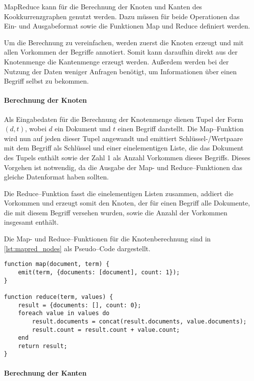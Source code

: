 MapReduce kann für die Berechnung der Knoten und Kanten des Kookkurrenzgraphen genutzt werden. Dazu müssen für beide Operationen das Ein- und Ausgabeformat sowie die Funktionen Map und Reduce definiert werden.

Um die Berechnung zu vereinfachen, werden zuerst die Knoten erzeugt und mit allen Vorkommen der Begriffe annotiert. Somit kann daraufhin direkt aus der Knotenmenge die Kantenmenge erzeugt werden. Außerdem werden bei der Nutzung der Daten weniger Anfragen benötigt, um Informationen über einen Begriff selbst zu bekommen.

\paragraph{Berechnung der Knoten}

Als Eingabedaten für die Berechnung der Knotenmenge dienen Tupel der Form \((d, t)\), wobei \(d\) ein Dokument und \(t\) einen Begriff darstellt. Die Map--Funktion wird nun auf jeden dieser Tupel angewandt und emittiert Schlüssel-/Wertpaare mit dem Begriff als Schlüssel und einer einelementigen Liste, die das Dokument des Tupels enthält sowie der Zahl \num{1} als Anzahl Vorkommen dieses Begriffs. Dieses Vorgehen ist notwendig, da die Ausgabe der Map- und Reduce--Funktionen das gleiche Datenformat haben sollten.

Die Reduce--Funktion fasst die einelementigen Listen zusammen, addiert die Vorkommen und erzeugt somit den Knoten, der für einen Begriff alle Dokumente, die mit diesem Begriff versehen wurden, sowie die Anzahl der Vorkommen insgesamt enthält.

Die Map- und Reduce--Funktionen für die Knotenberechnung sind in \cref{lst:mapred_nodes} als Pseudo--Code dargestellt.

\begin{lstlisting}[language=pseudo, label={lst:mapred_nodes}, caption={Knotenerzeugung mit MapReduce}]
function map(document, term) {
    emit(term, {documents: [document], count: 1});
}

function reduce(term, values) {
    result = {documents: [], count: 0};
    foreach value in values do
        result.documents = concat(result.documents, value.documents);
        result.count = result.count + value.count;
    end
    return result;
}
\end{lstlisting}

\paragraph{Berechnung der Kanten}

